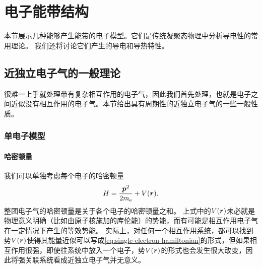 \section{电子能带结构}\label{sec:electron-band-structure}

本节展示几种能够产生能带的电子模型。它们是传统凝聚态物理中分析导电性的常用理论。
我们还将讨论它们产生的导电和导热特性。

\subsection{近独立电子气的一般理论}

很难一上手就处理带有复杂相互作用的电子气，因此我们首先处理，也就是电子之间近似没有相互作用的电子气。本节给出具有周期性的近独立电子气的一些一般性质。

\subsubsection{单电子模型}

\paragraph{哈密顿量} 我们可以单独考虑每个电子的哈密顿量
\begin{equation}
    {H} = \frac{{\vb*{p}}^2}{2m_\text{e}} + V(\vb*{r}).
    \label{eq:single-electron-hamiltonian}
\end{equation}
整团电子气的哈密顿量是关于各个电子的哈密顿量之和。
上式中的$V(\vb*{r})$未必就是物理意义明确（比如由原子核施加的库伦能）的势能，而有可能是相互作用电子气在一定情况下产生的等效势能。
实际上，对任何一个相互作用系统，都可以找到势$V(\vb*{r})$使得其能量近似可以写成\eqref{eq:single-electron-hamiltonian}的形式，但如果相互作用很强，即使往系统中放入一个电子，势$V(\vb*{r})$的形式也会发生很大改变，因此将强关联系统看成近独立电子气并无意义。

